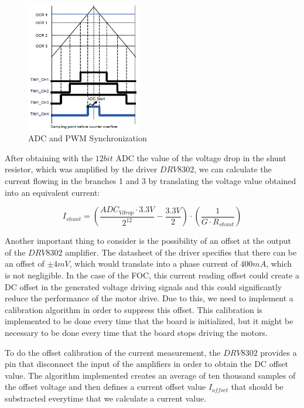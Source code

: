 \begin{figure}[htbp]
\centering
\includegraphics[width=5cm]{Images/pwm_adc.png} 
\caption[ADC and PWM Synchronization]{ADC and PWM Synchronization}
\label{fig:pwm_adc}
\end{figure}

After obtaining with the $12bit$ \ac{ADC} the value of the voltage drop in the shunt resistor, which was amplified by the driver $DRV8302$, we can calculate the current flowing in the branches 1 and 3 by translating the voltage value obtained into an equivalent current:

\begin{equation}
	I_{shunt} = (\frac{ ADC_{Vdrop} \cdot 3.3V }{ 2^{12} } - \frac{3.3V}{2}) \cdot (\frac{1}{G \cdot R_{shunt}})
\end{equation}

Another important thing to consider is the possibility of an offset at the output of the $DRV8302$ amplifier. The datasheet of the driver specifies that there can be an offset of $\pm 4mV$, which would translate into a phase current of $400mA$, which is not negligible. In the case of the \ac{FOC}, this current reading offset could create a \ac{DC} offset in the generated voltage driving signals and this could significantly reduce the performance of the motor drive. Due to this, we need to implement a calibration algorithm in order to suppress this offset. This calibration is implemented to be done every time that the board is initialized, but it might be necessary to be done every time that the board stops driving the motors.

To do the offset calibration of the current measurement, the $DRV8302$ provides a pin that disconnect the input of the amplifiers in order to obtain the \ac{DC} offset value. The algorithm implemented creates an average of ten thousand samples of the offset voltage and then defines a current offset value $I_{offset}$ that should be substracted everytime that we calculate a current value.

